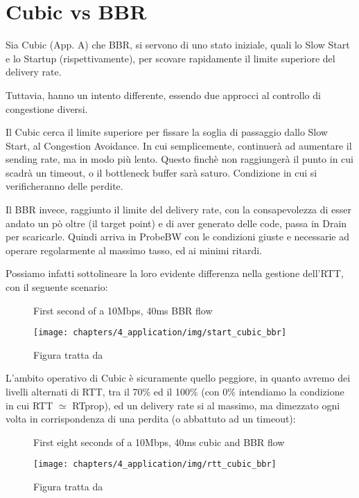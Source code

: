 \section{Cubic vs BBR}

Sia Cubic (App. A) che BBR, si servono di uno stato iniziale, quali lo Slow Start e lo Startup (rispettivamente), per scovare rapidamente il limite superiore del delivery rate. \bigskip

Tuttavia, hanno un intento differente, essendo due approcci al controllo di congestione diversi. \bigskip

Il Cubic cerca il limite superiore per fissare la soglia di passaggio dallo Slow Start, al Congestion Avoidance. In cui semplicemente, continuerà ad aumentare il sending rate, ma in modo più lento. Questo finchè non raggiungerà il punto in cui scadrà un timeout, o il bottleneck buffer sarà saturo. Condizione in cui si verificheranno delle perdite. \bigskip

Il BBR invece, raggiunto il limite del delivery rate, con la consapevolezza di esser andato un pò oltre (il target point) e di aver generato delle code, passa in Drain per scaricarle.
Quindi arriva in ProbeBW con le condizioni giuste e necessarie ad operare regolarmente al massimo tasso, ed ai minimi ritardi. \bigskip

Possiamo infatti sottolineare la loro evidente differenza nella gestione dell'RTT, con il seguente scenario:

\begin{figure}[H]

\center
\caption{First second of a 10Mbps, 40ms BBR flow}
\texttt{[image: chapters/4\_application/img/start\_cubic\_bbr]}
\caption*{Figura tratta da \cite[p.~63]{Cardwell:2017:BCC:3042068.3009824}}

\end{figure}

L'ambito operativo di Cubic è sicuramente quello peggiore, in quanto avremo dei livelli alternati di RTT, tra il 70\% ed il 100\% (con 0\% intendiamo la condizione in cui RTT $ \simeq $ RTprop), ed un delivery rate si al massimo, ma dimezzato ogni volta in corrispondenza di una perdita (o abbattuto ad un timeout):

\begin{figure}[H]

\center
\caption{First eight seconds of a 10Mbps, 40ms cubic and BBR flow}
\texttt{[image: chapters/4\_application/img/rtt\_cubic\_bbr]}
\caption*{Figura tratta da \cite[p.~64]{Cardwell:2017:BCC:3042068.3009824}}

\end{figure}

